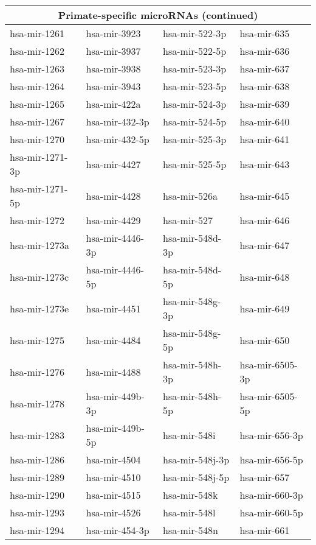 \begin{table}
\centering
\vfill
\begin{tabular}{|l|l|l|l|}
\hline
\multicolumn{4}{|c|}{\bf Primate-specific microRNAs (continued)} \\
\hline
  \hline
  hsa-mir-1261 & hsa-mir-3923 & hsa-mir-522-3p & hsa-mir-635 \\ 
  hsa-mir-1262 & hsa-mir-3937 & hsa-mir-522-5p & hsa-mir-636 \\ 
  hsa-mir-1263 & hsa-mir-3938 & hsa-mir-523-3p & hsa-mir-637 \\ 
  hsa-mir-1264 & hsa-mir-3943 & hsa-mir-523-5p & hsa-mir-638 \\ 
  hsa-mir-1265 & hsa-mir-422a & hsa-mir-524-3p & hsa-mir-639 \\ 
  hsa-mir-1267 & hsa-mir-432-3p & hsa-mir-524-5p & hsa-mir-640 \\ 
  hsa-mir-1270 & hsa-mir-432-5p & hsa-mir-525-3p & hsa-mir-641 \\ 
  hsa-mir-1271-3p & hsa-mir-4427 & hsa-mir-525-5p & hsa-mir-643 \\ 
  hsa-mir-1271-5p & hsa-mir-4428 & hsa-mir-526a & hsa-mir-645 \\ 
  hsa-mir-1272 & hsa-mir-4429 & hsa-mir-527 & hsa-mir-646 \\ 
  hsa-mir-1273a & hsa-mir-4446-3p & hsa-mir-548d-3p & hsa-mir-647 \\ 
  hsa-mir-1273c & hsa-mir-4446-5p & hsa-mir-548d-5p & hsa-mir-648 \\ 
  hsa-mir-1273e & hsa-mir-4451 & hsa-mir-548g-3p & hsa-mir-649 \\ 
  hsa-mir-1275 & hsa-mir-4484 & hsa-mir-548g-5p & hsa-mir-650 \\ 
  hsa-mir-1276 & hsa-mir-4488 & hsa-mir-548h-3p & hsa-mir-6505-3p \\ 
  hsa-mir-1278 & hsa-mir-449b-3p & hsa-mir-548h-5p & hsa-mir-6505-5p \\ 
  hsa-mir-1283 & hsa-mir-449b-5p & hsa-mir-548i & hsa-mir-656-3p \\ 
  hsa-mir-1286 & hsa-mir-4504 & hsa-mir-548j-3p & hsa-mir-656-5p \\ 
  hsa-mir-1289 & hsa-mir-4510 & hsa-mir-548j-5p & hsa-mir-657 \\ 
  hsa-mir-1290 & hsa-mir-4515 & hsa-mir-548k & hsa-mir-660-3p \\ 
  hsa-mir-1293 & hsa-mir-4526 & hsa-mir-548l & hsa-mir-660-5p \\ 
  hsa-mir-1294 & hsa-mir-454-3p & hsa-mir-548n & hsa-mir-661 \\ 

\end{tabular}
\end{table}
